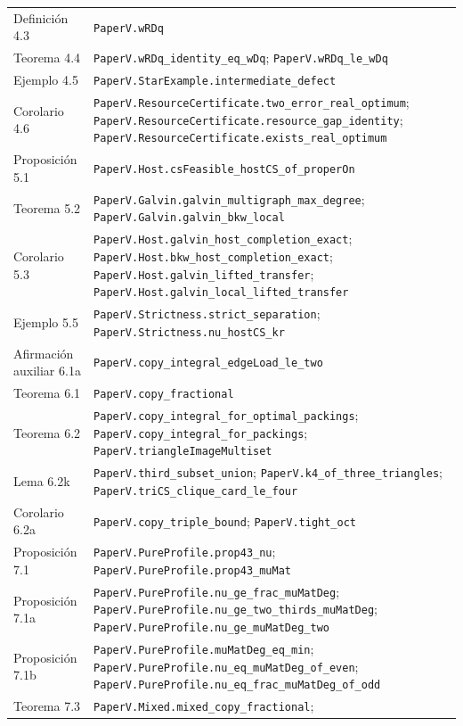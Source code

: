 \documentclass[spanish,11pt,a4paper]{article}
\begin{document}
{\begin{longtable}[]{@{}
  >{\raggedright\arraybackslash}p{}
  >{\raggedright\arraybackslash}p{}@{}}
Definición 4.3 & \texttt{PaperV.wRDq} \\
Teorema 4.4 & \nolinkurl{PaperV.wRDq_identity_eq_wDq};
\nolinkurl{PaperV.wRDq_le_wDq} \\
Ejemplo 4.5 & \nolinkurl{PaperV.StarExample.intermediate_defect} \\
Corolario 4.6 &
\nolinkurl{PaperV.ResourceCertificate.two_error_real_optimum};
\nolinkurl{PaperV.ResourceCertificate.resource_gap_identity};
\nolinkurl{PaperV.ResourceCertificate.exists_real_optimum} \\
Proposición 5.1 &
\nolinkurl{PaperV.Host.csFeasible_hostCS_of_properOn} \\
Teorema 5.2 & \nolinkurl{PaperV.Galvin.galvin_multigraph_max_degree};
\nolinkurl{PaperV.Galvin.galvin_bkw_local} \\
Corolario 5.3 & \nolinkurl{PaperV.Host.galvin_host_completion_exact};
\nolinkurl{PaperV.Host.bkw_host_completion_exact};
\nolinkurl{PaperV.Host.galvin_lifted_transfer};
\nolinkurl{PaperV.Host.galvin_local_lifted_transfer} \\
Ejemplo 5.5 & \nolinkurl{PaperV.Strictness.strict_separation};
\nolinkurl{PaperV.Strictness.nu_hostCS_kr} \\
Afirmación auxiliar 6.1a &
\nolinkurl{PaperV.copy_integral_edgeLoad_le_two} \\
Teorema 6.1 & \nolinkurl{PaperV.copy_fractional} \\
Teorema 6.2 & \nolinkurl{PaperV.copy_integral_for_optimal_packings};
\nolinkurl{PaperV.copy_integral_for_packings};
\nolinkurl{PaperV.triangleImageMultiset} \\
Lema 6.2k & \nolinkurl{PaperV.third_subset_union};
\nolinkurl{PaperV.k4_of_three_triangles};
\nolinkurl{PaperV.triCS_clique_card_le_four} \\
Corolario 6.2a & \nolinkurl{PaperV.copy_triple_bound};
\texttt{PaperV.tight\_oct} \\
Proposición 7.1 & \nolinkurl{PaperV.PureProfile.prop43_nu};
\nolinkurl{PaperV.PureProfile.prop43_muMat} \\
Proposición 7.1a & \nolinkurl{PaperV.PureProfile.nu_ge_frac_muMatDeg};
\nolinkurl{PaperV.PureProfile.nu_ge_two_thirds_muMatDeg};
\nolinkurl{PaperV.PureProfile.nu_ge_muMatDeg_two} \\
Proposición 7.1b & \nolinkurl{PaperV.PureProfile.muMatDeg_eq_min};
\nolinkurl{PaperV.PureProfile.nu_eq_muMatDeg_of_even};
\nolinkurl{PaperV.PureProfile.nu_eq_frac_muMatDeg_of_odd} \\
Teorema 7.3 & \nolinkurl{PaperV.Mixed.mixed_copy_fractional};

\end{longtable}}
\end{document}
